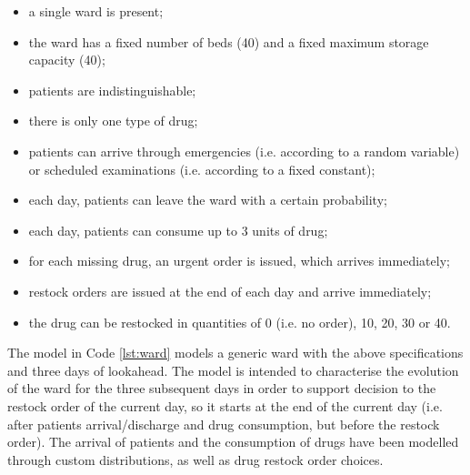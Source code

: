     \begin{itemize}
      \item a single ward is present;
      \item the ward has a fixed number of beds (40) and a fixed maximum storage capacity (40);
      \item patients are indistinguishable;
      \item there is only one type of drug;
      \item patients can arrive through emergencies (i.e. according to a random variable) or scheduled examinations (i.e. according to a fixed constant);
      \item each day, patients can leave the ward with a certain probability;
      \item each day, patients can consume up to 3 units of drug;
      \item for each missing drug, an urgent order is issued, which arrives immediately;
      \item restock orders are issued at the end of each day and arrive immediately;
      \item the drug can be restocked in quantities of 0 (i.e. no order), 10, 20, 30 or 40.
    \end{itemize}
    
    The model in Code \ref{lst:ward} models a generic ward with the above specifications and three days of lookahead. The model is intended to characterise the evolution of the ward for the three subsequent days in order to support decision to the restock order of the current day, so it starts at the end of the current day (i.e. after patients arrival/discharge and drug consumption, but before the restock order). The arrival of patients and the consumption of drugs have been modelled through custom distributions, as well as drug restock order choices.
    
    \begin{center}
      
    \end{center}
    
